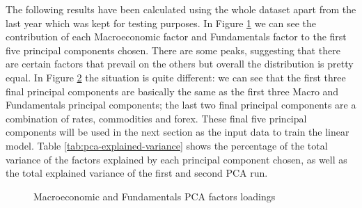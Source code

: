 The following results have been calculated using the whole dataset apart from the last year which was kept for testing purposes.
In Figure \ref{fig:factor-contribution-pca1} we can see the contribution of each Macroeconomic factor and Fundamentals factor to the first five principal components chosen. There are some peaks, suggesting that there are certain factors that prevail on the others but overall the distribution is pretty equal.
In Figure \ref{fig:factor-contribution-pca2} the situation is quite different: we can see that the first three final principal components are basically the same as the first three Macro and Fundamentals principal components; the last two final principal components are a combination of rates, commodities and forex.
These final five principal components will be used in the next section as the input data to train the linear model.
Table \ref{tab:pca-explained-variance} shows the percentage of the total variance of the factors explained by each principal component chosen, as well as the total explained variance of the first and second PCA run.

\begin{table}[htb]
	\centering
	\caption{Percentages of explained variance for each principal component and the total variance for the first and second PCA run}
	\label{tab:pca-explained-variance}
\end{table} 

\begin{figure}[htb]
	\centering
	
	\caption{Macroeconomic and Fundamentals PCA factors loadings}
	\label{fig:factor-contribution-pca1}
\end{figure}

\begin{figure}[htb]
	\centering
	
	\caption{}
	\label{fig:factor-contribution-pca2}
\end{figure}

